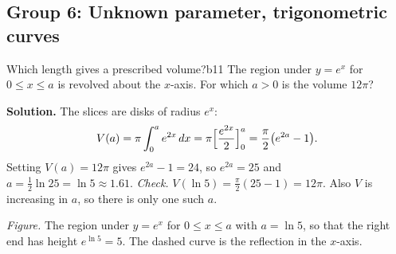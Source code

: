 \documentclass[11pt]{article}
\begin{document}
\subsection*{Group 6: Unknown parameter, trigonometric curves}

\begin{exmp}{Which length gives a prescribed volume?}{b11}
The region under $y=e^x$ for $0\le x\le a$ is revolved about the $x$-axis. For which $a>0$ is the volume $12\pi$?

\textbf{Solution.} The slices are disks of radius $e^x$:
\[
V(a)=\pi\int_0^ae^{2x}\,dx=\pi\Bigl[\frac{e^{2x}}2\Bigr]_0^a=\frac\pi2\bigl(e^{2a}-1\bigr).
\]
Setting $V(a)=12\pi$ gives $e^{2a}-1=24$, so $e^{2a}=25$ and $a=\frac12\ln25=\ln5\approx1.61$.
\emph{Check.} $V(\ln5)=\frac\pi2(25-1)=12\pi$. \checkmark Also $V$ is increasing in $a$, so there is only one such $a$.
\begin{center}
\par\small\emph{Figure.} The region under $y=e^x$ for $0\le x\le a$ with $a=\ln5$, so that the right end has height $e^{\ln5}=5$. The dashed curve is the reflection in the $x$-axis.
\end{center}
\end{exmp}
\end{document}
